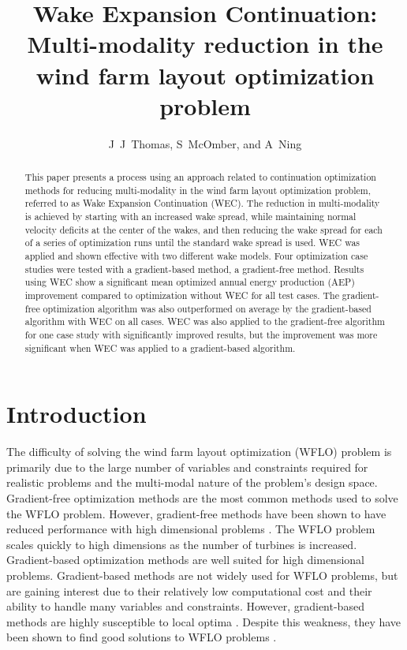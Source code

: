 \documentclass{jpconf}
\begin{document}
\title{Wake Expansion Continuation: \large{Multi-modality reduction in the wind farm layout optimization problem}}

\author{J~J~Thomas, S~McOmber, and A~Ning}
\address{Department of Mechanical Engineering,
Brigham Young University, Provo, Utah, USA}

\begin{abstract}
	This paper presents a process using an approach related to  continuation optimization methods for reducing multi-modality in the wind farm layout optimization problem, referred to as Wake Expansion Continuation (WEC). The reduction in multi-modality is achieved by starting with an increased wake spread, while maintaining normal velocity deficits at the center of the wakes, and then reducing the wake spread for each of a series of optimization runs until the standard wake spread is used. WEC was applied and shown effective with two different wake models. Four optimization case studies were tested with a gradient-based method, a gradient-free method. Results using WEC show a significant mean optimized annual energy production (AEP) improvement compared to optimization without WEC for all test cases. The gradient-free optimization algorithm was also outperformed on average by the gradient-based algorithm with WEC on all cases. WEC was also applied to the gradient-free algorithm for one case study with significantly improved results, but the improvement was more significant when WEC was applied to a gradient-based algorithm.
\end{abstract}

\section{Introduction}

The difficulty of solving the wind farm layout optimization (WFLO) problem is primarily due to the large number of variables and constraints required for realistic problems and the multi-modal nature of the problem's design space. Gradient-free optimization methods are the most common methods used to solve the WFLO problem. However, gradient-free methods have been shown to have reduced performance with high dimensional problems \cite{rios2013-grad-free-comparison}. The WFLO problem scales quickly to high dimensions as the number of turbines is increased. Gradient-based optimization methods are well suited for high dimensional problems. Gradient-based methods are not widely used for WFLO problems, but are gaining interest due to their relatively low computational cost and their ability to handle many variables and constraints. However, gradient-based methods are highly susceptible to local optima \cite{acero2014}. Despite this weakness, they have been shown to find good solutions to WFLO problems \cite{fleming2015, guirguis2016, gebraad2017-Maximization-Annual}.  
\end{document}
